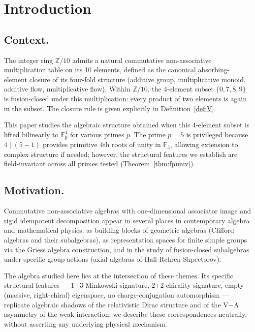 \documentclass[11pt,reqno]{amsart}
\theoremstyle{plain}
\theoremstyle{definition}
\theoremstyle{remark}
\newcommand{\Z}{\mathbb{Z}}
\newcommand{\F}{\mathbb{F}}
\begin{document}
\tableofcontents

\section{Introduction}
\label{sec:intro}

\subsection{Context.}
The integer ring $\Z/10$ admits a natural commutative non-associative
multiplication table on its 10 elements, defined as the canonical absorbing-
element closure of its four-fold structure (additive group, multiplicative
monoid, additive flow, multiplicative flow). Within $\Z/10$, the 4-element
subset $\{0, 7, 8, 9\}$ is fusion-closed under this multiplication: every
product of two elements is again in the subset. The closure rule is given
explicitly in Definition~\ref{def:V}.

This paper studies the algebraic structure obtained when this 4-element
subset is lifted bilinearly to $\F_p^4$ for various primes $p$. The
prime $p=5$ is privileged because $4 \mid (5-1)$ provides primitive 4th
roots of unity in $\F_5$, allowing extension to complex structure if
needed; however, the structural features we establish are
field-invariant across all primes tested (Theorem~\ref{thm:fpuniv}).

\subsection{Motivation.}
Commutative non-associative algebras with one-dimensional associator
image and rigid idempotent decomposition appear in several places in
contemporary algebra and mathematical physics: as building blocks of
geometric algebras (Clifford algebras and their subalgebras), as
representation spaces for finite simple groups via the Griess algebra
construction, and in the study of fusion-closed subalgebras under
specific group actions (axial algebras of Hall-Rehren-Shpectorov).

The algebra studied here lies at the intersection of these themes. Its
specific structural features --- 1+3 Minkowski signature, 2+2 chirality
signature, empty (massive, right-chiral) eigenspace, no
charge-conjugation automorphism --- replicate algebraic shadows of the
relativistic Dirac structure and of the V$-$A asymmetry of the weak
interaction; we describe these correspondences neutrally, without
asserting any underlying physical mechanism.
\end{document}
